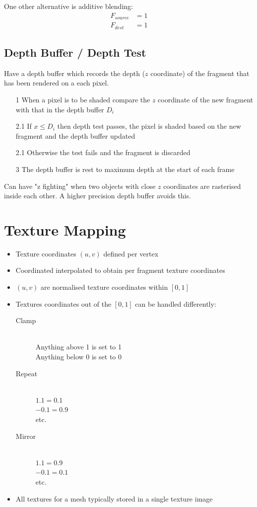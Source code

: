 \documentclass[a4paper]{article}
\begin{document}
One other alternative is additive blending:
\begin{align*}
  F_{source} &= 1 \\
    F_{dest} &= 1
\end{align*}

\subsection{Depth Buffer / Depth Test}

Have a depth buffer which records the depth ($z$ coordinate) of the fragment
that has been rendered on a each pixel.

\begin{enumerate}
  \item[1]   When a pixel is to be shaded compare the $z$ coordinate of the new
             fragment with that in the depth buffer $D_{i}$
  \item[2.1] If $x \leq D_{i}$ then depth test passes, the pixel is shaded based
             on the new fragment and the depth buffer updated
  \item[2.1] Otherwise the test fails and the fragment is discarded
  \item[3]   The depth buffer is rest to maximum depth at the start of each
             frame
\end{enumerate}

Can have "z fighting" when two objects with close $z$ coordinates are rasterised
inside each other. A higher precision depth buffer avoids this.

\section{Texture Mapping}

\begin{itemize}
  \item Texture coordinates $(u, v)$ defined per vertex
  \item Coordinated interpolated to obtain per fragment texture coordinates
  \item $(u, v)$ are normalised texture coordinates within $[0, 1]$
  \item Textures coordinates out of the $[0, 1]$ can be handled differently:
    \begin{description}
      \item[Clamp] \hfill \\
        Anything above 1 is set to 1 \\
        Anything below 0 is set to 0
      \item[Repeat] \hfill \\
        $1.1 = 0.1$ \\
        $-0.1 = 0.9$ \\
        etc.
      \item[Mirror] \hfill \\
        $1.1 = 0.9$ \\
        $-0.1 = 0.1$ \\
        etc.
    \end{description}
  \item All textures for a mesh typically stored in a single texture image
\end{itemize}
\end{document}
